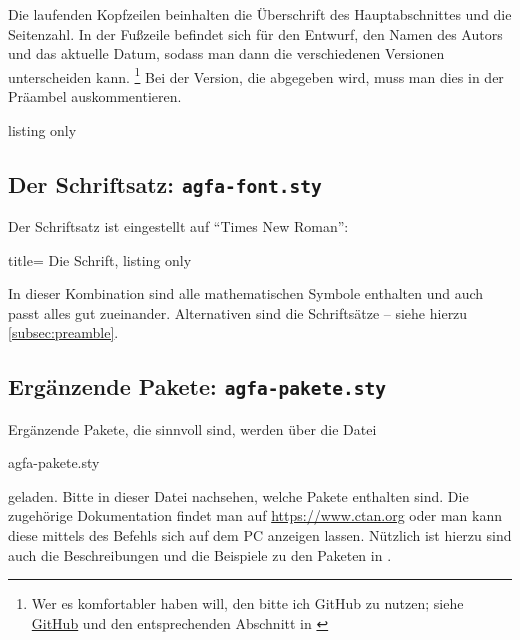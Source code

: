 \subsubsection{}\label{subsec:kopfzeile}
%
Die laufenden Kopfzeilen beinhalten die Überschrift des Hauptabschnittes und die Seitenzahl.
In der Fußzeile befindet sich für den Entwurf, den Namen des Autors und das aktuelle Datum, sodass man dann die verschiedenen Versionen unterscheiden kann.%
\footnote{Wer es komfortabler haben will, den bitte ich GitHub zu nutzen; siehe \href{https://github.com}{GitHub} und den entsprechenden Abschnitt in \textcite{schlosser:2016}}
Bei der Version, die abgegeben wird, muss man  dies in der Präambel auskommentieren.

%
\begin{tcblisting}{listing only}
\rofoot{\today}
\end{tcblisting}
%
%
\subsection{Der Schriftsatz: \texttt{agfa-font.sty}}\label{agfa-font}
%
Der Schriftsatz ist eingestellt auf \enquote{Times New Roman}: 
\begin{tcblisting}{title= Die Schrift, listing only}
\usepackage{mathptmx}	%
	\usepackage[scaled=.90]{helvet}
	\usepackage{courier} 
\end{tcblisting}
%
In dieser Kombination sind alle mathematischen Symbole enthalten und auch passt alles gut zueinander.
Alternativen sind die Schriftsätze \href{https://www.ctan.org/pkg/lm}{} \bzw 
\href{https://www.ctan.org/pkg/libertinus}{} -- siehe hierzu \vref{subsec:preamble}.
%
\subsection{Ergänzende Pakete: \texttt{agfa-pakete.sty}}\label{subsec:agfa-pakete}
%
Ergänzende Pakete, die sinnvoll sind, werden über die Datei
%
\begin{tcolorbox}
agfa-pakete.sty
\end{tcolorbox}
%
geladen.
Bitte in dieser Datei nachsehen, welche Pakete enthalten sind.
Die zugehörige Dokumentation findet man auf \href{https://www.ctan.org}{https://www.ctan.org} oder man kann  diese mittels des Befehls   sich auf dem PC anzeigen lassen.
Nützlich ist hierzu sind auch die Beschreibungen und die Beispiele zu den Paketen in \textcite{voss:2014}.
%
